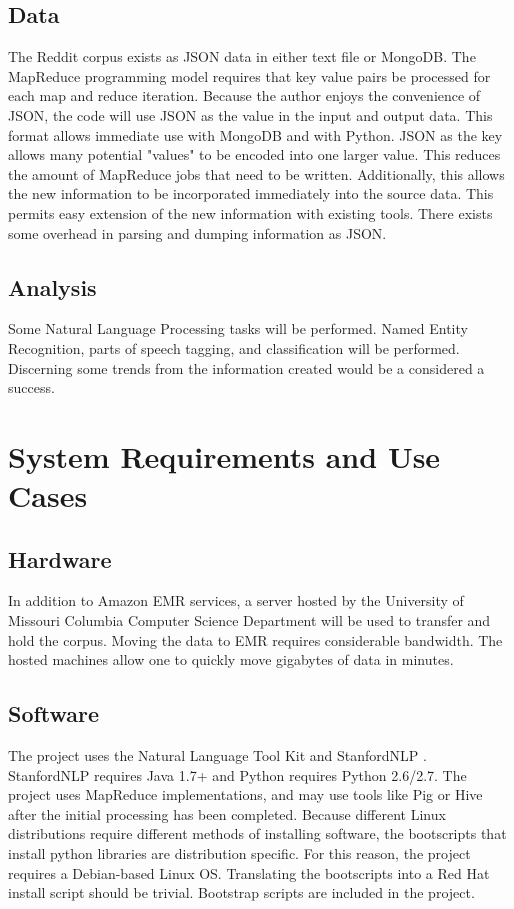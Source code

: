 \documentclass[12pt,a4paper]{article}
\begin{document}
\subsection{Data}

The Reddit corpus exists as JSON data in either text file
or MongoDB. The MapReduce programming model requires
that key value pairs be processed for each map
and reduce iteration. Because the author enjoys
the convenience of JSON, the code will use JSON as the 
value in the input and output data. This format
allows immediate use with MongoDB and with Python.
JSON as the key allows many potential "values" to
be encoded into one larger value. This reduces the
amount of MapReduce jobs that need to be written. Additionally,
this allows the new information to be incorporated
immediately into the source data. This permits easy
extension of the new information with existing
tools. There exists some overhead in parsing and dumping
information as JSON.

\subsection{Analysis}

Some Natural Language Processing tasks will be performed.
Named Entity Recognition, parts of speech tagging, and 
classification will be performed. Discerning some
trends from the information created would be a 
considered a success. \cite{postag1} \cite{postag2}

\section{System Requirements and Use Cases}

\subsection{Hardware}

In addition to Amazon EMR services, a server hosted by the
University of Missouri Columbia Computer Science
Department will be used to transfer and hold the corpus.
Moving the data to EMR requires considerable bandwidth. The
hosted machines allow one to quickly move gigabytes of data
in minutes.

\subsection{Software}

The project uses the Natural Language Tool Kit \cite{pythonnlp} and
StanfordNLP \cite{stanfordnlp}. StanfordNLP requires Java 1.7+ and Python
requires Python 2.6/2.7. The project uses MapReduce implementations,
and may use tools like Pig \cite{piglatin} or Hive after the initial processing
has been completed. Because different Linux distributions
require different methods of installing software, the bootscripts
that install python libraries are distribution specific. For this
reason, the project requires a Debian-based Linux OS. Translating
the bootscripts into a Red Hat install script should be trivial.
Bootstrap scripts are included in the project.
\end{document}
